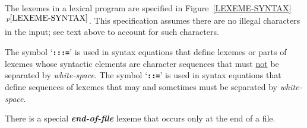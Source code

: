\documentclass[12pt]{article}
\newcommand{\ttkey}[1]{{\tt \bfseries #1}}
\newcommand{\emkey}[1]{{\em \bfseries #1}}
\newcommand{\itemref}[1]{\ref{#1}$\,^{p\pageref{#1}}$}
\newlength{\figurewidth}
\newenvironment{boxedfigure}[1][!btp]%
	{\begin{figure*}[#1]
	 \begin{lrbox}{\figurebox}
	 \begin{minipage}{\figurewidth}

	 \vspace*{1ex}}%
	{
	 \vspace*{1ex}

	 \end{minipage}
	 \end{lrbox}
	 \begin{center}
	 \fbox{\hspace*{0.1in}\usebox{\figurebox}\hspace*{0.1in}}
	 \end{center}
	 \end{figure*}}
\newenvironment{indpar}[1][0.3in]%
	{\begin{list}{}%
		     {\setlength{\itemsep}{0in}%
		      \setlength{\topsep}{0in}%
		      \setlength{\parsep}{1ex}%
		      \setlength{\labelwidth}{#1}%
		      \setlength{\leftmargin}{#1}%
		      \addtolength{\leftmargin}{\labelsep}}%
	 \item}%
	{\end{list}}
\begin{document}
The lexemes in a lexical program are specified in
Figure~\itemref{LEXEME-SYNTAX}.  This specification assumes there
are no illegal characters in the input; see text
above to account for such characters.

The symbol `\ttkey{:::=}' is used in syntax equations
that define lexemes or parts of lexemes whose syntactic elements are
character sequences that must \underline{not} be separated by {\em white-space}.
The symbol `\ttkey{::=}'
is used in syntax equations that define sequences of lexemes that may
and sometimes must be separated by {\em white-space}.

There is a special \emkey{end-of-file}\label{END-OF-FILE}
lexeme that occurs only at the end of a file.


\begin{boxedfigure}[!p]
\begin{indpar}


\end{indpar}
\end{boxedfigure}
\end{document}
